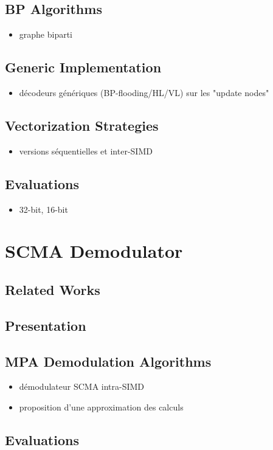 \subsection{BP Algorithms}

\begin{itemize}
  \item graphe biparti
\end{itemize}

\subsection{Generic Implementation}

\begin{itemize}
  \item décodeurs génériques (BP-flooding/HL/VL) sur les "update nodes"
\end{itemize}

\subsection{Vectorization Strategies}

\begin{itemize}
  \item versions séquentielles et inter-SIMD
\end{itemize}

\subsection{Evaluations}

\begin{itemize}
  \item 32-bit, 16-bit
\end{itemize}

\section{SCMA Demodulator~\cite{Ghaffari2019}}

\subsection{Related Works}

\subsection{Presentation}

\subsection{MPA Demodulation Algorithms}

\begin{itemize}
  \item démodulateur SCMA intra-SIMD
  \item proposition d'une approximation des calculs
\end{itemize}

\subsection{Evaluations}
